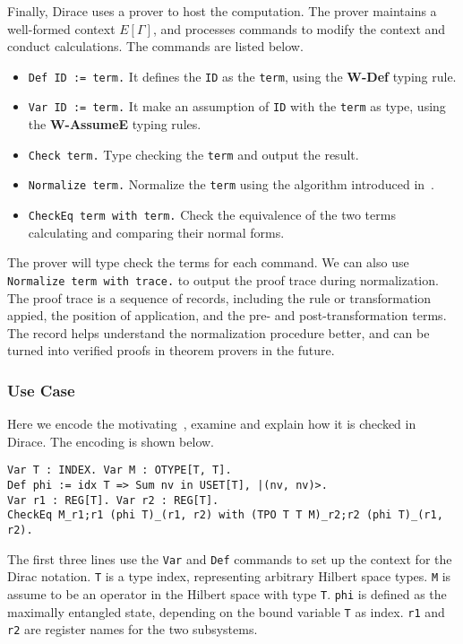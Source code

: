 \documentclass[runningheads]{llncs}
\begin{document}
Finally, Dirace uses a prover to host the computation. The prover maintains a well-formed context $E[\Gamma]$, and processes commands to modify the context and conduct calculations. The commands are listed below.
\begin{itemize}
    \item \texttt{\textcolor{NavyBlue}{Def} ID := term.} It defines the \texttt{ID} as the \texttt{term}, using the \textbf{W-Def} typing rule.
    \item \texttt{\textcolor{NavyBlue}{Var} ID := term.} It make an assumption of \texttt{ID} with the \texttt{term} as type, using the \textbf{W-AssumeE} typing rules.
    \item \texttt{\textcolor{NavyBlue}{Check} term.} Type checking the \texttt{term} and output the result.
    \item \texttt{\textcolor{NavyBlue}{Normalize} term.} Normalize the \texttt{term} using the algorithm introduced in~.
    \item \texttt{\textcolor{NavyBlue}{CheckEq} term \textcolor{NavyBlue}{with} term.} Check the equivalence of the two terms calculating and comparing their normal forms.
\end{itemize}
The prover will type check the terms for each command. We can also use \texttt{\textcolor{NavyBlue}{Normalize} term \textcolor{NavyBlue}{with trace}.} to output the proof trace during normalization. The proof trace is a sequence of records, including the rule or transformation appied, the position of application, and the pre- and post-transformation terms. The record helps understand the normalization procedure better, and can be turned into verified proofs in theorem provers in the future.

\subsubsection{Use Case}
Here we encode the motivating~, examine and explain how it is checked in Dirace. The encoding is shown below.

    \begin{lstlisting}[style=dirace]
Var T : INDEX. Var M : OTYPE[T, T].
Def phi := idx T => Sum nv in USET[T], |(nv, nv)>.
Var r1 : REG[T]. Var r2 : REG[T].
CheckEq M_r1;r1 (phi T)_(r1, r2) with (TPO T T M)_r2;r2 (phi T)_(r1, r2).
    \end{lstlisting}        

The first three lines use the \texttt{\textcolor{NavyBlue}{Var}} and \texttt{\textcolor{NavyBlue}{Def}} commands to set up the context for the Dirac notation.
\texttt{T} is a type index, representing arbitrary Hilbert space types. \texttt{M} is assume to be an operator in the Hilbert space with type \texttt{T}. \texttt{phi} is defined as the maximally entangled state, depending on the bound variable \texttt{T} as index.
\texttt{r1} and \texttt{r2} are register names for the two subsystems.
\end{document}
